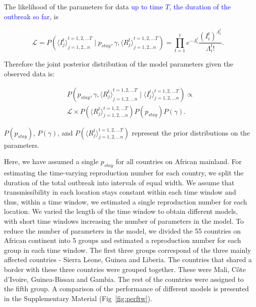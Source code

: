 \documentclass[9pt,twocolumn,twoside,lineno]{pnas-new}
\newcommand{\sangeeta}[1]{\textcolor{blue}{#1}}
\begin{document}
{The likelihood of the parameters for data \sangeeta{up to time $T$, the duration
of the outbreak so far}, is

\begin{equation*}
  \mathcal{L} = P
  \left(
    {\langle I_{j}^{t} \rangle}_{j = 1, 2 \dots n}^{t = 1, 2, \dots T} \mid
    p_{stay},
    \gamma,
    {\langle R_{j}^{t} \rangle}_{j = 1, 2 \dots n}^{t = 1, 2, \dots T}\right) = 
     \prod_{t = 1}^{t}{e^{-\Lambda_{i}^{t}} 
       \frac{\left(I_{i}^{t}\right)^{\Lambda_{i}^{t}}}{\Lambda_{i}^{t} !}}.
  \end{equation*}

Therefore the joint posterior distribution of the model parameters 
given the observed data is:

\begin{equation*}
  \begin{aligned}
  & P\left(p_{stay}, \gamma, {\langle R_{j}^{t}\rangle}_{j = 1, 2, \dots n}^{t = 1, 2, \dots T}
   \mid 
   \langle I_{j}^{t}\rangle_{j = 1, 2, \dots n}^{t = 1, 2, \dots T} \right)
   \propto  \\
   & \mathcal{L} \times 
   P\left(\langle R_{j}^{t}\rangle_{j = 1, 2, \dots n}^{t = 1, 2, \dots T}\right) 
   P\left( p_{stay} \right) P\left( \gamma \right).
   \end{aligned}
\end{equation*}


\(P\left( p_{stay} \right)\), \(P\left( \gamma \right)\), and
\(P\left(\langle R_{j}^{t}\rangle_{j = 1, 2, \dots n}^{t = 1, 2, \dots T}\right)\) represent
the prior distributions on the parameters.

Here, we have assumed a single \(p_{stay}\) for all countries on African
mainland. For estimating the time-varying reproduction number for each
country, we split the duration of the total outbreak into intervals of
equal width. We assume that transmissibility in each location stays
constant within each time window and thus, within a time window, we
estimated a single reproduction number for each location. 
We varied the length of the time window to obtain different models, with short time
windows increasing the number of parameters in the model. 
To reduce
the number of parameters in the model, we divided the 55 countries on
African continent into 5 groups and estimated a reproduction number
for each group in each time window. The first three groups correspond
of the three mainly affected countries - Sierra Leone, Guinea and Liberia.
The countries that shared a border with these three countries
were grouped together. These were Mali, Côte d'Ivoire, Guinea-Bissau
and Gambia. The rest of the countries were assigned to the fifth group.
A comparison
of the performance of different models is presented in the Supplementary
Material (Fig~\ref{fig:perftw}).

}
\end{document}
